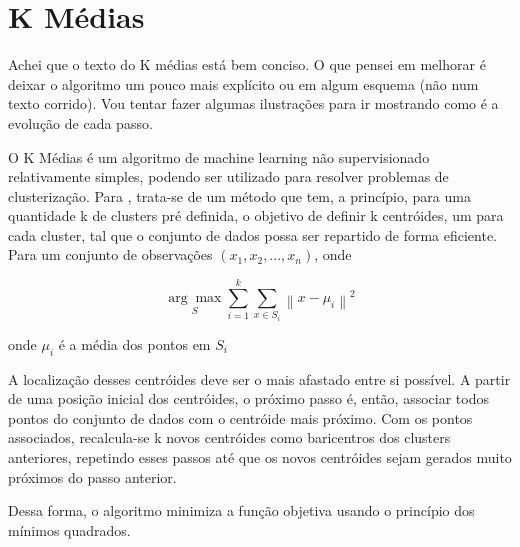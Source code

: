 \section{K Médias}


\begin{mdframed}[backgroundcolor=blue!20] 
        Achei que o texto do K médias está bem conciso. O que pensei em melhorar é deixar o algoritmo um pouco mais explícito ou em algum esquema (não num texto corrido). Vou tentar fazer algumas ilustrações para ir mostrando como é a evolução de cada passo.
\end{mdframed}

O K Médias é um algoritmo de machine learning não supervisionado relativamente simples, podendo ser utilizado para resolver problemas de clusterização. Para , trata-se de um método que tem, a princípio, para uma quantidade k de clusters pré definida, o objetivo de definir k centróides, um para cada cluster, tal que o conjunto de dados possa ser repartido de forma eficiente. Para um conjunto de observações \begin{math}(x_{1}, x_{2}, ..., x_{n})\end{math}, onde 

\begin{equation}
\label{eq:media}
\underset{S}{\arg\max} \sum_{i=1}^{k} \sum_{x \in S_{i}}\left \| x - \mu_{i} \right \|^{2}
\end{equation}

onde \begin{math}\mu_{i}\end{math} é a média dos pontos em \begin{math}S_{i}\end{math}


A localização desses centróides deve ser o mais afastado entre si possível. A partir de uma posição inicial dos centróides, o próximo passo é, então, associar todos pontos do conjunto de dados com o centróide mais próximo. Com os pontos associados, recalcula-se k novos centróides como baricentros dos clusters anteriores, repetindo esses passos até que os novos centróides sejam gerados muito próximos do passo anterior. 


Dessa forma, o algoritmo minimiza a função objetiva usando o princípio dos mínimos quadrados. 
